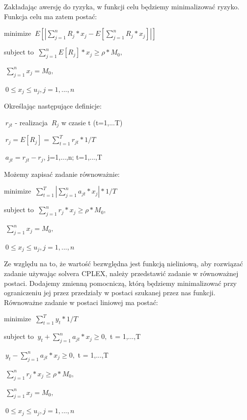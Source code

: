 \documentclass[11pt]{article} %
\begin{document}
Zakładając awersję do ryzyka, w funkcji celu będziemy minimalizować ryzyko.
Funkcja celu ma zatem postać:
\begin{center}

minimize $\  E[| \sum_{j=1}^{n} R_j * x_j - E[  \sum_{j=1}^{n} R_j*x_j]  |]$

subject to $\  \sum_{j=1}^{n} E[R_j]*x_j \geqslant \rho * M_0,$

$\ \sum_{j=1}^{n} x_j = M_0,$
 
$\  0 \leqslant  x_j \leqslant  u_j, j = 1, ..., n$
\end{center}

Określając następujące definicje:
\begin{center}

$\ r_{jt} $ 
 - realizacja $\ R_j $ w czasie t (t=1,...T)

$\ r_j = E[R_j] =  \sum_{t=1}^{T} r_{jt}*1/T $

$\ a_{jt} = r_{jt} - r_j $, j=1,...,n; t=1,...,T
\end{center}

Możemy zapisać zadanie równoważnie:

\begin{center}

minimize $\   \sum_{t=1}^{T} |  \sum_{j=1}^{n} a_{jt} * x_j | * 1/T $

subject to $\  \sum_{j=1}^{n} r_j*x_j \geqslant  \rho * M_0,$

$\ \sum_{j=1}^{n} x_j = M_0,$
 
$\  0 \leqslant  x_j \leqslant  u_j, j = 1, ..., n$

\end{center}

Ze względu na to, że wartość bezwględna jest funkcją nieliniową, aby rozwiązać zadanie używając solvera CPLEX, należy przedstawić zadanie w równoważnej postaci. Dodajemy zmienną pomocniczą, którą będziemy minimalizować przy ograniczeniu jej przez przedziały w postaci szukanej przez nas funkcji. Równoważne zadanie w postaci liniowej ma postać:

\begin{center}
minimize $\   \sum_{t=1}^{T} y_t * 1/T $
 
subject to $\  y_t + \sum_{j=1}^{n} a_{jt} * x_j \geqslant 0, $ t = 1,...,T

$\  y_t - \sum_{j=1}^{n} a_{jt} * x_j \geqslant 0, $ t = 1,...,T

$\  \sum_{j=1}^{n} r_j*x_j \geqslant  \rho * M_0,$

$\ \sum_{j=1}^{n} x_j = M_0,$
 
$\  0 \leqslant  x_j \leqslant  u_j, j = 1, ..., n$
\end{center}
\end{document}
